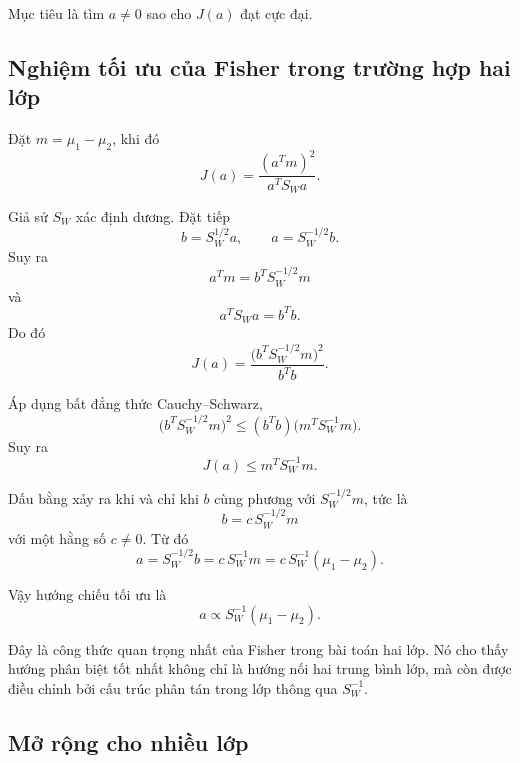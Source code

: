 Mục tiêu là tìm $a \neq 0$ sao cho $J(a)$ đạt cực đại.

\subsection{Nghiệm tối ưu của Fisher trong trường hợp hai lớp}

Đặt $m=\mu_1-\mu_2$, khi đó
\begin{equation}
J(a)=\frac{(a^T m)^2}{a^T S_W a}.
\end{equation}

Giả sử $S_W$ xác định dương. Đặt tiếp
\begin{equation}
b=S_W^{1/2}a, \qquad a=S_W^{-1/2}b.
\end{equation}
Suy ra
\begin{equation}
a^T m = b^T S_W^{-1/2}m
\end{equation}
và
\begin{equation}
a^T S_W a = b^T b.
\end{equation}
Do đó
\begin{equation}
J(a)=\frac{\bigl(b^T S_W^{-1/2}m\bigr)^2}{b^T b}.
\end{equation}

Áp dụng bất đẳng thức Cauchy--Schwarz,
\begin{equation}
\bigl(b^T S_W^{-1/2}m\bigr)^2 \le (b^T b)\bigl(m^T S_W^{-1}m\bigr).
\end{equation}
Suy ra
\begin{equation}
J(a)\le m^T S_W^{-1}m.
\end{equation}

Dấu bằng xảy ra khi và chỉ khi $b$ cùng phương với $S_W^{-1/2}m$, tức là
\begin{equation}
b=c\,S_W^{-1/2}m
\end{equation}
với một hằng số $c\neq 0$. Từ đó
\begin{equation}
a=S_W^{-1/2}b
= c\,S_W^{-1}m
= c\,S_W^{-1}(\mu_1-\mu_2).
\end{equation}

Vậy hướng chiếu tối ưu là
\begin{equation}
a \propto S_W^{-1}(\mu_1-\mu_2).
\end{equation}

Đây là công thức quan trọng nhất của Fisher trong bài toán hai lớp. Nó cho thấy hướng phân biệt tốt nhất không chỉ là hướng nối hai trung bình lớp, mà còn được điều chỉnh bởi cấu trúc phân tán trong lớp thông qua $S_W^{-1}$.

\subsection{Mở rộng cho nhiều lớp}

